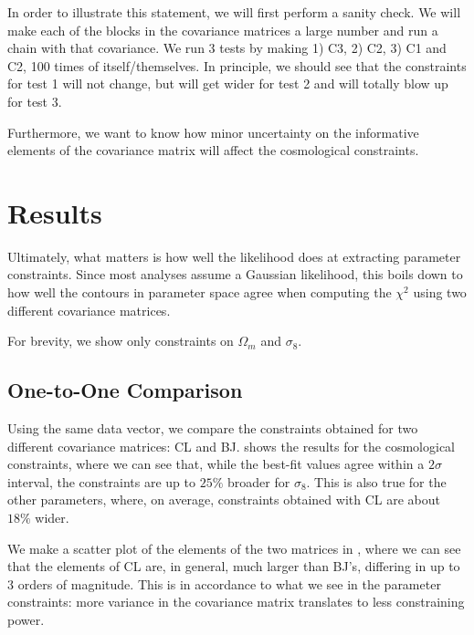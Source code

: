 \documentclass[twocolumn]{\docclass}
\begin{document}
	In order to illustrate this statement, we will first perform a sanity check. We will make each of the blocks in the covariance matrices a large number and run a chain with that covariance. We run 3 tests by making
	1) C3,  
	2) C2, 
	3) C1 and C2,
	100 times of itself/themselves. In principle, we should see that the constraints for test 1 will not change, but will get wider for test 2 and will totally blow up for test 3.
	
	Furthermore, we want to know how minor uncertainty on the informative elements of the covariance matrix will affect the cosmological constraints. 
	
	
	
	\section{Results}
	\label{sec:results}
	
	Ultimately, what matters is how well the likelihood does at extracting parameter constraints. Since most analyses assume a Gaussian likelihood, this boils down to how well the contours in parameter space agree when computing the $\chi^2$ using two different covariance matrices.
	
	For brevity, we show only constraints on $\Omega_m$ and $\sigma_8$.
	
	\subsection{One-to-One Comparison}
	
	Using the same data vector, we compare the constraints obtained for two different covariance matrices: CL and BJ.   shows the results for the cosmological constraints, where we can see that, while the best-fit values agree within a $2 \sigma$ interval, the constraints are up to $25 \%$ broader for $\sigma_8$. This is also true for the other parameters, where, on average, constraints obtained with CL are about $18 \%$ wider.
	
	We make a scatter plot of the elements of the two matrices in , where we can see that the elements of CL are, in general, much larger than BJ's, differing in up to 3 orders of magnitude. This is in accordance to what we see in the parameter constraints: more variance in the covariance matrix translates to less constraining power.
	
\end{document}
